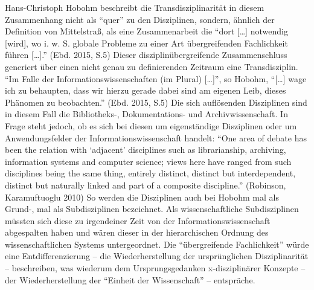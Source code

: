 \documentclass[a4paper,
fontsize=11pt,
oneside,
numbers=noperiodatend,
parskip=half-,
bibliography=totoc,
final
]{scrartcl}
\begin{document}
Hans-Christoph Hobohm beschreibt die Transdisziplinarität in diesem
Zusammenhang nicht als \enquote{quer} zu den Disziplinen, sondern,
ähnlich der Definition von Mittelstraß, als eine Zusammenarbeit die
\enquote{dort {[}\ldots{}{]} notwendig {[}wird{]}, wo i. w. S. globale
Probleme zu einer Art übergreifenden Fachlichkeit führen
{[}\ldots{}{]}.} (Ebd. 2015, S.5) Dieser disziplinübergreifende
Zusammenschluss generiert über einen nicht genau zu definierenden
Zeitraum eine Transdisziplin. \enquote{Im Falle der
Informationswissenschaften (im Plural) {[}\ldots{}{]}}, so Hobohm,
\enquote{{[}\ldots{}{]} wage ich zu behaupten, dass wir hierzu gerade
dabei sind am eigenen Leib, dieses Phänomen zu beobachten.} (Ebd. 2015,
S.5) Die sich auflösenden Disziplinen sind in diesem Fall die
Bibliotheks-, Dokumentations- und Archivwissenschaft. In Frage steht
jedoch, ob es sich bei diesen um eigenständige Disziplinen oder um
Anwendungsfelder der Informationswissenschaft handelt: \enquote{One area
of debate has been the relation with \enquote{adjacent} disciplines such
as librarianship, archiving, information systems and computer science;
views here have ranged from such disciplines being the same thing,
entirely distinct, distinct but interdependent, distinct but naturally
linked and part of a composite discipline.} (Robinson, Karamuftuoglu
2010) So werden die Disziplinen auch bei Hobohm mal als Grund-, mal als
Subdisziplinen bezeichnet. Als wissenschaftliche Subdisziplinen müssten
sich diese zu irgendeiner Zeit von der Informationswissenschaft
abgespalten haben und wären dieser in der hierarchischen Ordnung des
wissenschaftlichen Systems untergeordnet. Die \enquote{übergreifende
Fachlichkeit} würde eine Entdifferenzierung -- die Wiederherstellung der
ursprünglichen Disziplinarität -- beschreiben, was wiederum dem
Ursprungsgedanken x-disziplinärer Konzepte -- der Wiederherstellung der
\enquote{Einheit der Wissenschaft} -- entspräche.
\end{document}

